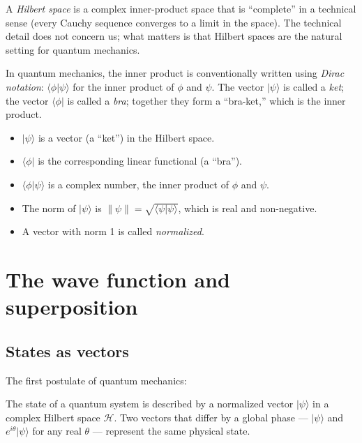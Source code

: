 A \emph{Hilbert space} is a complex inner-product space that is
``complete'' in a technical sense (every Cauchy sequence converges
to a limit in the space). The technical detail does not concern us;
what matters is that Hilbert spaces are the natural setting for
quantum mechanics.

In quantum mechanics, the inner product is conventionally written
using \emph{Dirac notation}: $\langle \phi | \psi \rangle$ for the
inner product of $\phi$ and $\psi$. The vector $|\psi\rangle$ is
called a \emph{ket}; the vector $\langle\phi|$ is called a \emph{bra};
together they form a ``bra-ket,'' which is the inner product.

\begin{notationbox}
\begin{itemize}[leftmargin=2em]
    \item $|\psi\rangle$ is a vector (a ``ket'') in the Hilbert space.
    \item $\langle\phi|$ is the corresponding linear functional (a
    ``bra'').
    \item $\langle\phi|\psi\rangle$ is a complex number, the inner
    product of $\phi$ and $\psi$.
    \item The norm of $|\psi\rangle$ is $\|\psi\| =
    \sqrt{\langle\psi|\psi\rangle}$, which is real and non-negative.
    \item A vector with norm 1 is called \emph{normalized}.
\end{itemize}
\end{notationbox}

\section{The wave function and superposition}
\label{sec:wavefunction}

\subsection{States as vectors}

The first postulate of quantum mechanics:

\begin{principlebox}
The state of a quantum system is described by a normalized vector
$|\psi\rangle$ in a complex Hilbert space $\mathcal{H}$. Two vectors
that differ by a global phase --- $|\psi\rangle$ and $e^{i\theta}
|\psi\rangle$ for any real $\theta$ --- represent the same physical
state.
\end{principlebox}

